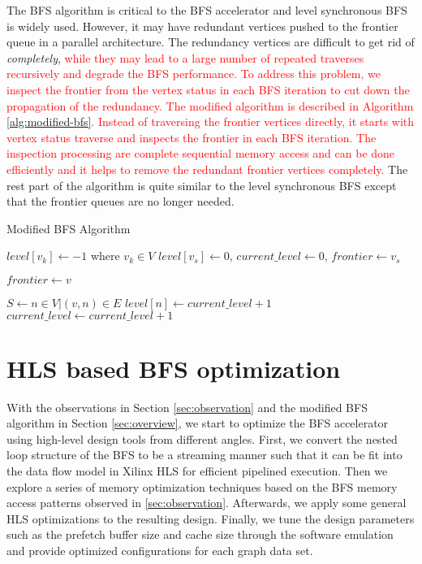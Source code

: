 The BFS algorithm is critical to the BFS accelerator 
and level synchronous BFS is widely used.  
However, it may have redundant vertices pushed to the 
frontier queue in a parallel architecture. The redundancy 
vertices are difficult to get rid of \textit{completely},
\textcolor{red}{while they may lead to a large 
number of repeated traverses recursively and degrade the BFS performance.
To address this problem, we inspect the frontier from the 
vertex status in each BFS iteration to cut down the 
propagation of the redundancy. The modified algorithm is described 
in Algorithm \ref{alg:modified-bfs}. Instead of traversing the frontier vertices directly, 
it starts with vertex status traverse and inspects the frontier 
in each BFS iteration. The inspection processing are complete sequential 
memory access and can be done efficiently and it helps to remove 
the redundant frontier vertices completely.} The rest part of the algorithm is 
quite similar to the level synchronous BFS except that the frontier queues 
are no longer needed.

\begin{algorithm}
	\caption{Modified BFS Algorithm} \label{alg:modified-bfs}
	\footnotesize
	\begin{algorithmic}[1]
		\State $level[v_k] \gets -1$ where $v_k \in V$
		\State $level[v_s] \gets 0$, $current\_level \gets 0$, $frontier \gets v_s$


		\State $frontier \gets v$
		\EndIf
		\EndFor

		\State $S \gets {n \in V | (v, n) \in E}$
		\State $level[n] \gets current\_level + 1$
		\EndIf
		\EndFor
		\EndFor
		\State $current\_level \gets current\_level + 1$
		\EndWhile
		\EndProcedure
	\end{algorithmic}
\end{algorithm}

\section{HLS based BFS optimization} \label{sec:bfs-opt}
With the observations in Section \ref{sec:observation} 
and the modified BFS algorithm in Section \ref{sec:overview}, 
we start to optimize the BFS accelerator using high-level design tools 
from different angles. First, we convert the nested loop structure 
of the BFS to be a streaming manner such that it can be fit into the data flow model in
Xilinx HLS for efficient pipelined execution. Then we explore a series of memory optimization 
techniques based on the BFS memory access patterns observed in \ref{sec:observation}. 
Afterwards, we apply some general HLS optimizations to the resulting design. Finally, 
we tune the design parameters such as the prefetch buffer size and cache size through 
the software emulation and provide optimized configurations for each graph data set.

